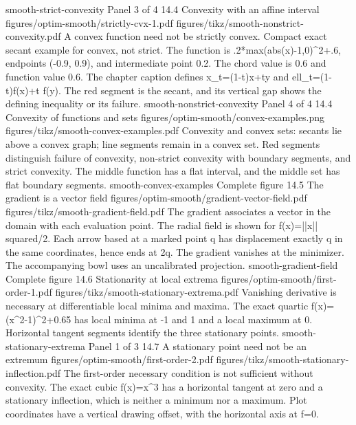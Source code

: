 {smooth-strict-convexity}
{Panel 3 of 4}
{14.4}
{Convexity with an affine interval}
{figures/optim-smooth/strictly-cvx-1.pdf}
{figures/tikz/smooth-nonstrict-convexity.pdf}
{A convex function need not be strictly convex.}
{Compact exact secant example for convex, not strict. The function is .2*max(abs(x)-1,0)\textasciicircum{}2+.6, endpoints (-0.9, 0.9), and intermediate point 0.2. The chord value is 0.6 and function value 0.6. The chapter caption defines x\_t=(1-t)x+ty and ell\_t=(1-t)f(x)+t f(y). The red segment is the secant, and its vertical gap shows the defining inequality or its failure.}
{smooth-nonstrict-convexity}
{Panel 4 of 4}
{14.4}
{Convexity of functions and sets}
{figures/optim-smooth/convex-examples.png}
{figures/tikz/smooth-convex-examples.pdf}
{Convexity and convex sets: secants lie above a convex graph; line segments remain in a convex set.}
{Red segments distinguish failure of convexity, non-strict convexity with boundary segments, and strict convexity. The middle function has a flat interval, and the middle set has flat boundary segments.}
{smooth-convex-examples}
{Complete figure}
{14.5}
{The gradient is a vector field}
{figures/optim-smooth/gradient-vector-field.pdf}
{figures/tikz/smooth-gradient-field.pdf}
{The gradient associates a vector in the domain with each evaluation point.}
{The radial field is shown for f(x)=||x|| squared/2. Each arrow based at a marked point q has displacement exactly q in the same coordinates, hence ends at 2q. The gradient vanishes at the minimizer. The accompanying bowl uses an uncalibrated projection.}
{smooth-gradient-field}
{Complete figure}
{14.6}
{Stationarity at local extrema}
{figures/optim-smooth/first-order-1.pdf}
{figures/tikz/smooth-stationary-extrema.pdf}
{Vanishing derivative is necessary at differentiable local minima and maxima.}
{The exact quartic f(x)=(x\textasciicircum{}2-1)\textasciicircum{}2+0.65 has local minima at -1 and 1 and a local maximum at 0. Horizontal tangent segments identify the three stationary points.}
{smooth-stationary-extrema}
{Panel 1 of 3}
{14.7}
{A stationary point need not be an extremum}
{figures/optim-smooth/first-order-2.pdf}
{figures/tikz/smooth-stationary-inflection.pdf}
{The first-order necessary condition is not sufficient without convexity.}
{The exact cubic f(x)=x\textasciicircum{}3 has a horizontal tangent at zero and a stationary inflection, which is neither a minimum nor a maximum. Plot coordinates have a vertical drawing offset, with the horizontal axis at f=0.}
